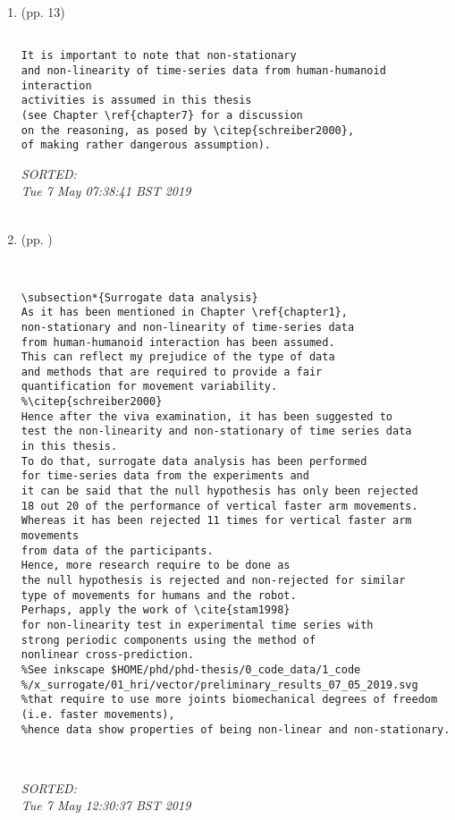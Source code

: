 \documentclass[12pt]{article}
\begin{document}
\begin{enumerate}

\item  (pp. 13)   

	\begin{verbatim}
	
It is important to note that non-stationary 
and non-linearity of time-series data from human-humanoid interaction
activities is assumed in this thesis  
(see Chapter \ref{chapter7} for a discussion
on the reasoning, as posed by \citep{schreiber2000},
of making rather dangerous assumption).

	\end{verbatim}
	\textit{
	SORTED: \\ 
	Tue  7 May 07:38:41 BST 2019 \\
	}
	\\


\item  (pp. )   

	\begin{verbatim}
	

\subsection*{Surrogate data analysis}
As it has been mentioned in Chapter \ref{chapter1},
non-stationary and non-linearity of time-series data 
from human-humanoid interaction has been assumed.
This can reflect my prejudice of the type of data 
and methods that are required to provide a fair 
quantification for movement variability.
%\citep{schreiber2000}
Hence after the viva examination, it has been suggested to 
test the non-linearity and non-stationary of time series data 
in this thesis.
To do that, surrogate data analysis has been performed 
for time-series data from the experiments and 
it can be said that the null hypothesis has only been rejected 
18 out 20 of the performance of vertical faster arm movements.
Whereas it has been rejected 11 times for vertical faster arm movements
from data of the participants.
Hence, more research require to be done as 
the null hypothesis is rejected and non-rejected for similar 
type of movements for humans and the robot.
Perhaps, apply the work of \cite{stam1998} 
for non-linearity test in experimental time series with 
strong periodic components using the method of 
nonlinear cross-prediction.
%See inkscape $HOME/phd/phd-thesis/0_code_data/1_code
%/x_surrogate/01_hri/vector/preliminary_results_07_05_2019.svg
%that require to use more joints biomechanical degrees of freedom (i.e. faster movements),
%hence data show properties of being non-linear and non-stationary.



	\end{verbatim}
	\textit{
	SORTED: \\ 
	Tue  7 May 12:30:37 BST 2019
	}
	\\






\end{enumerate}
\end{document}
